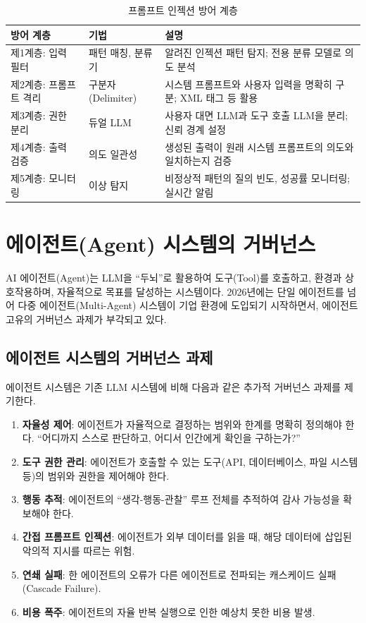 \begin{table}[htbp]
\centering
\caption{프롬프트 인젝션 방어 계층}
\label{tab:prompt_injection_defense}
\begin{tabularx}{\textwidth}{p{2.5cm}p{3cm}X}
\toprule
\textbf{방어 계층} & \textbf{기법} & \textbf{설명} \\
\midrule
제1계층: 입력 필터 & 패턴 매칭, 분류기 & 알려진 인젝션 패턴 탐지; 전용 분류 모델로 의도 분석 \\
\midrule
제2계층: 프롬프트 격리 & 구분자(Delimiter) & 시스템 프롬프트와 사용자 입력을 명확히 구분; XML 태그 등 활용 \\
\midrule
제3계층: 권한 분리 & 듀얼 LLM & 사용자 대면 LLM과 도구 호출 LLM을 분리; 신뢰 경계 설정 \\
\midrule
제4계층: 출력 검증 & 의도 일관성 & 생성된 출력이 원래 시스템 프롬프트의 의도와 일치하는지 검증 \\
\midrule
제5계층: 모니터링 & 이상 탐지 & 비정상적 패턴의 질의 빈도, 성공률 모니터링; 실시간 알림 \\
\bottomrule
\end{tabularx}
\end{table}


\section{에이전트(Agent) 시스템의 거버넌스}
\label{sec:13.6}

AI 에이전트(Agent)는 LLM을 ``두뇌''로 활용하여 도구(Tool)를 호출하고, 환경과 상호작용하며, 자율적으로 목표를 달성하는 시스템이다. 2026년에는 단일 에이전트를 넘어 다중 에이전트(Multi-Agent) 시스템이 기업 환경에 도입되기 시작하면서, 에이전트 고유의 거버넌스 과제가 부각되고 있다.

\subsection{에이전트 시스템의 거버넌스 과제}
\label{sec:13.6.1}

에이전트 시스템은 기존 LLM 시스템에 비해 다음과 같은 추가적 거버넌스 과제를 제기한다.

\begin{enumerate}
 \item \textbf{자율성 제어}: 에이전트가 자율적으로 결정하는 범위와 한계를 명확히 정의해야 한다. ``어디까지 스스로 판단하고, 어디서 인간에게 확인을 구하는가?''
 \item \textbf{도구 권한 관리}: 에이전트가 호출할 수 있는 도구(API, 데이터베이스, 파일 시스템 등)의 범위와 권한을 제어해야 한다.
 \item \textbf{행동 추적}: 에이전트의 ``생각-행동-관찰'' 루프 전체를 추적하여 감사 가능성을 확보해야 한다.
 \item \textbf{간접 프롬프트 인젝션}: 에이전트가 외부 데이터를 읽을 때, 해당 데이터에 삽입된 악의적 지시를 따르는 위험.
 \item \textbf{연쇄 실패}: 한 에이전트의 오류가 다른 에이전트로 전파되는 캐스케이드 실패(Cascade Failure).
 \item \textbf{비용 폭주}: 에이전트의 자율 반복 실행으로 인한 예상치 못한 비용 발생.
\end{enumerate}

